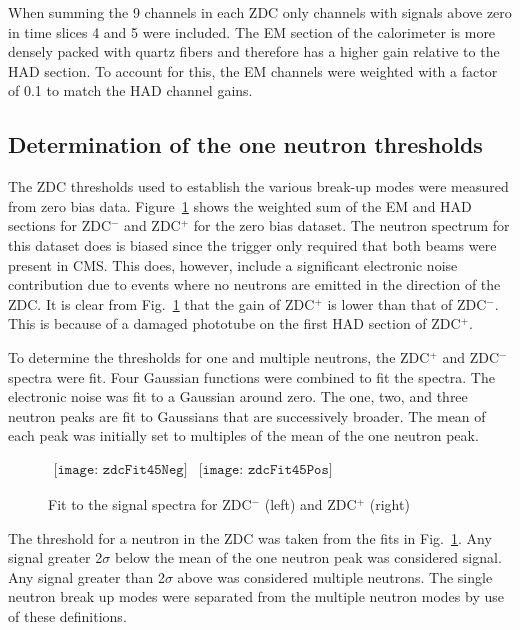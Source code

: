      
      When summing the 9 channels in each ZDC only channels with signals above 
        zero in time slices 4 and 5 were included. 
      The EM section of the calorimeter is more densely packed with quartz 
        fibers and therefore has a higher gain relative to the HAD section. 
      To account for this, the EM channels were weighted with
        a factor of 0.1 to match the HAD channel gains.

    \subsection{Determination of the one neutron thresholds}
      The ZDC thresholds used to establish the various break-up modes were 
        measured from zero bias data.
      Figure~\ref{fig:zdcM2Fit} shows the weighted sum of the EM and 
        HAD sections for  ZDC$^{-}$ and  ZDC$^{+}$ for the zero bias 
        dataset.
      The neutron spectrum for this dataset does is biased since the 
        trigger only required that both beams were present in CMS. 
      This does, however, include a significant electronic noise contribution due
        to events where no neutrons are emitted in the direction of the ZDC.
      It is clear from Fig.~\ref{fig:zdcM2Fit} that the gain of  
        ZDC$^{+}$ is lower than that of ZDC$^{-}$. 
      This is because of a damaged phototube on the first HAD section 
        of ZDC$^{+}$.

      To determine the thresholds for one and multiple neutrons, the ZDC$^{+}$ 
        and ZDC$^{-}$ spectra were fit.
      Four Gaussian functions were combined to fit the spectra. 
      The electronic noise was fit to a Gaussian around zero.
      The one, two, and three neutron peaks are fit to Gaussians that are 
        successively broader.
      The mean of each peak was initially set to multiples of the mean of the 
        one neutron peak. 
      \begin{figure}[!Hh]
        \centering
        $ 
          \begin{array}{cc}
            \texttt{[image: zdcFit45Neg]} &
            \texttt{[image: zdcFit45Pos]}
          \end{array} 
        $
        \caption{Fit to the signal spectra for ZDC$^{-}$ (left) and ZDC$^{+}$ 
          (right)}
        \label{fig:zdcM2Fit}
      \end{figure}
      The threshold for a neutron in the ZDC was taken from the fits in 
        Fig.~\ref{fig:zdcM2Fit}.
      Any signal greater 2$\sigma$ below the mean of the one neutron peak was 
        considered signal.
      Any signal greater than 2$\sigma$ above was considered multiple 
        neutrons.
      The single neutron break up modes were separated from the multiple 
        neutron modes by use of these definitions.

